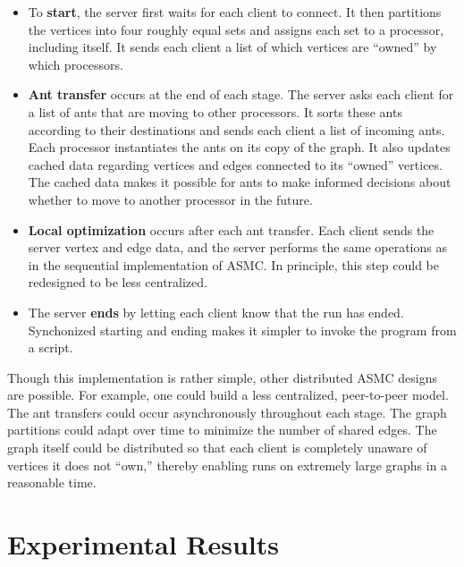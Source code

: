 \documentclass[11pt]{article}
\begin{document}
\begin{itemize}

\item To {\bf start}, the server first waits for each client to connect.  It
then partitions the vertices into four roughly equal sets and assigns each set
to a processor, including itself.  It sends each client a list of which
vertices are ``owned'' by which processors.

\item {\bf Ant transfer} occurs at the end of each stage.  The server asks
each client for a list of ants that are moving to other processors.  It sorts
these ants according to their destinations and sends each client a list of
incoming ants.  Each processor instantiates the ants on its copy of the graph.
It also updates cached data regarding vertices and edges connected to its
``owned'' vertices.  The cached data makes it possible for ants to make
informed decisions about whether to move to another processor in the future.

\item {\bf Local optimization} occurs after each ant transfer.  Each client
sends the server vertex and edge data, and the server performs the same
operations as in the sequential implementation of ASMC.  In principle, this
step could be redesigned to be less centralized.

\item The server {\bf ends} by letting each client know that the run has
ended.  Synchonized starting and ending makes it simpler to invoke the program
from a script.

\end{itemize}



Though this implementation is rather simple, other distributed ASMC designs
are possible.  For example, one could build a less centralized, peer-to-peer
model.  The ant transfers could occur asynchronously throughout each stage.
The graph partitions could adapt over time to minimize the number of shared
edges.  The graph itself could be distributed so that each client is
completely unaware of vertices it does not ``own,'' thereby enabling runs on
extremely large graphs in a reasonable time.

\section{Experimental Results}\label{results}
\end{document}
